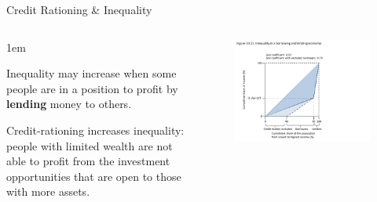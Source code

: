\documentclass[11pt,aspectratio=43,usenames,dvipsnames]{beamer}
\let\olditemize=\itemize
\let\endolditemize=\enditemize
\renewenvironment{itemize}{\olditemize \itemsep1em}{\endolditemize}
\theoremstyle{definition}
\begin{document}
\begin{frame}{Credit Rationing \& Inequality}
\label{slide:Credit_Rationing____Inequality}
    \begin{columns}
        \begin{column}{0.4\textwidth}
            \begin{itemize}
                \item Inequality may increase when some people are in a position to profit by \textbf{lending} money to others.
                \item Credit-rationing increases inequality: people with \alert{limited wealth} are \alert{not able to profit from the investment} opportunities that are open to those with more
assets.
            \end{itemize}
        \end{column}
        \begin{column}{0.6\textwidth}
            \begin{figure}
                \centering
                \includegraphics[trim = {1cm 0cm 8.5cm 2.5cm}, clip, width=\textwidth]{./figures/Figure28.pdf}
            \end{figure}

        \end{column}
    \end{columns}

\end{frame}
\end{document}
